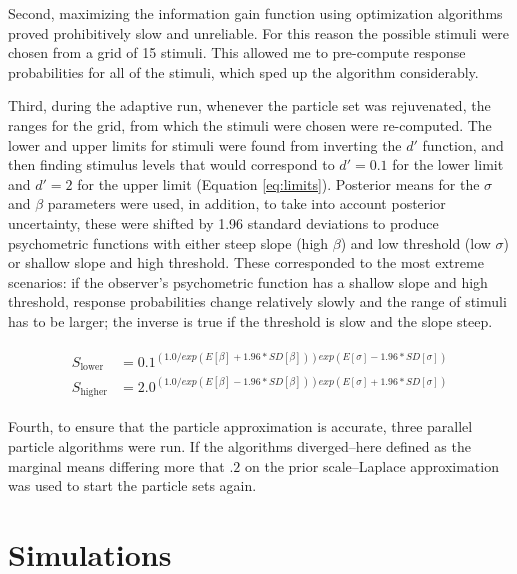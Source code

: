 \documentclass{article}\usepackage{knitr}
\begin{document}
Second, maximizing the information gain function using optimization algorithms proved prohibitively slow and unreliable. For this reason the possible stimuli were chosen from a grid of 15 stimuli. This allowed me to pre-compute response probabilities for all of the stimuli, which sped up the algorithm considerably. 

Third, during the adaptive run, whenever the particle set was rejuvenated, the ranges for the grid, from which the stimuli were chosen were re-computed. The lower and upper limits for stimuli were found from inverting the $d'$ function, and then finding stimulus levels that would correspond to $d' = 0.1$ for the lower limit and $d' = 2$ for the upper limit (Equation \ref{eq:limits}). Posterior means for the $\sigma$ and $\beta$ parameters were used, in addition, to take into account posterior uncertainty, these were shifted by 1.96 standard deviations to produce psychometric functions with either steep slope (high $\beta$) and low threshold (low $\sigma$) or shallow slope and high threshold. These corresponded to the most extreme scenarios: if the observer's psychometric function has a shallow slope and high threshold, response probabilities change relatively slowly and the range of stimuli has to be larger; the inverse is true if the threshold is slow and the slope steep. 

\begin{align}
\begin{split}
\label{eq:limits}
S_{\text{lower}} &= 0.1^{(1.0 / exp(E[\beta] + 1.96 * SD[\beta])) exp(E[\sigma] - 1.96 * SD[\sigma])}
\\ 
S_{\text{higher}} &= 2.0^ {(1.0 / exp(E[\beta] - 1.96 * SD[\beta])) exp(E[\sigma] + 1.96 * SD[\sigma])}
\end{split}
\end{align}

Fourth, to ensure that the particle approximation is accurate, three parallel particle algorithms were run. If the algorithms diverged--here defined as the marginal means differing more that $.2$ on the prior scale--Laplace approximation was used to start the particle sets again.

\newpage


\section{Simulations}
\label{sec:simulations}
\end{document}

